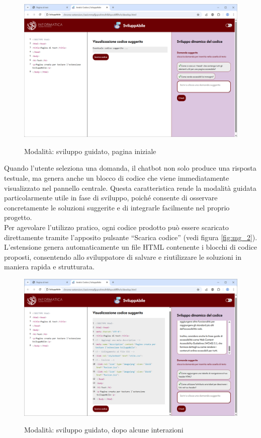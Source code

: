 \begin{figure}[H]
    \centering
    \includegraphics[width=1\linewidth, alt={Modalità di sviluppo guidato}]{img/mg.png}
    \caption{Modalità: sviluppo guidato, pagina iniziale}\label{fig:aass}
\end{figure}

\noindent Quando l’utente seleziona una domanda, il chatbot non solo produce una risposta testuale, ma genera anche un blocco di codice che viene immediatamente visualizzato nel pannello centrale. Questa caratteristica rende la modalità guidata particolarmente utile in fase di sviluppo, poiché consente di osservare concretamente le soluzioni suggerite e di integrarle facilmente nel proprio progetto.\\
Per agevolare l’utilizzo pratico, ogni codice prodotto può essere scaricato direttamente tramite l’apposito pulsante “Scarica codice” (vedi figura \ref{fig:mg_2}). L’estensione genera automaticamente un file HTML contenente i blocchi di codice proposti, consentendo allo sviluppatore di salvare e riutilizzare le soluzioni in maniera rapida e strutturata.

\begin{figure}[H]
    \centering
    \includegraphics[width=1\linewidth, alt={Modalità di sviluppo guidato, dopo un'interazione}]{img/mg2.png}
    \caption{Modalità: sviluppo guidato, dopo alcune interazioni}\label{fig:aass}
\end{figure}

